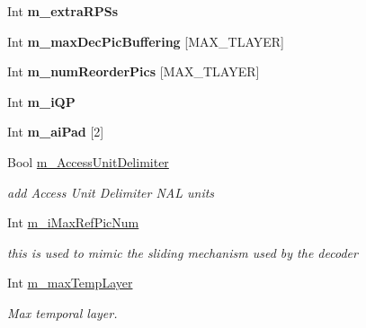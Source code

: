 \begin{DoxyCompactItemize}
\item 
\mbox{\label{class_t_enc_cfg_a40638615187c18190d200bfb5454fdb2}} 
Int {\bfseries m\+\_\+extra\+R\+P\+Ss}
\item 
\mbox{\label{class_t_enc_cfg_ad0fbb10152b1f6a30ca16b33396f4ee3}} 
Int {\bfseries m\+\_\+max\+Dec\+Pic\+Buffering} \mbox{[}M\+A\+X\+\_\+\+T\+L\+A\+Y\+ER\mbox{]}
\item 
\mbox{\label{class_t_enc_cfg_a868f60de04ba455f185c5ad85beb3635}} 
Int {\bfseries m\+\_\+num\+Reorder\+Pics} \mbox{[}M\+A\+X\+\_\+\+T\+L\+A\+Y\+ER\mbox{]}
\item 
\mbox{\label{class_t_enc_cfg_ab344d44ccdfa6500a22124a3dd907e78}} 
Int {\bfseries m\+\_\+i\+QP}
\item 
\mbox{\label{class_t_enc_cfg_afa4490e7f9dc3202de046016a770d5f2}} 
Int {\bfseries m\+\_\+ai\+Pad} \mbox{[}2\mbox{]}
\item 
\mbox{\label{class_t_enc_cfg_a818a5ec8b9ba4462a30937f24bc78fc3}} 
Bool \hyperlink{class_t_enc_cfg_a818a5ec8b9ba4462a30937f24bc78fc3}{m\+\_\+\+Access\+Unit\+Delimiter}
\begin{DoxyCompactList}\small\item\em add Access Unit Delimiter N\+AL units \end{DoxyCompactList}\item 
\mbox{\label{class_t_enc_cfg_a8123c5031df76a16dcf9dd619beb7dac}} 
Int \hyperlink{class_t_enc_cfg_a8123c5031df76a16dcf9dd619beb7dac}{m\+\_\+i\+Max\+Ref\+Pic\+Num}
\begin{DoxyCompactList}\small\item\em this is used to mimic the sliding mechanism used by the decoder \end{DoxyCompactList}\item 
\mbox{\label{class_t_enc_cfg_a849d039c96e3a82c248acecb617284f1}} 
Int \hyperlink{class_t_enc_cfg_a849d039c96e3a82c248acecb617284f1}{m\+\_\+max\+Temp\+Layer}
\begin{DoxyCompactList}\small\item\em Max temporal layer. \end{DoxyCompactList}\item 

\end{DoxyCompactItemize}

